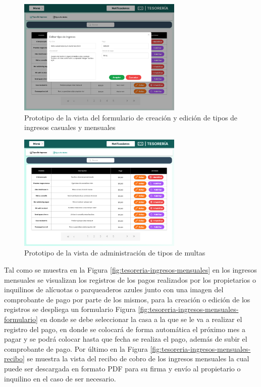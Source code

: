\begin{figure}[H]
    \centering
    \includegraphics[width=0.7\textwidth]{resources/images/tesoreia - tipos edit}
    \caption{Prototipo de la vista del formulario de creación y edición de tipos de ingresos casuales y mensuales}
    \label{fig:tesoreria-tipos-edit}
\end{figure}

\begin{figure}[H]
    \centering
    \includegraphics[width=0.7\textwidth]{resources/images/tesoreia - multas}
    \caption{Prototipo de la vista de administración de tipos de multas}
    \label{fig:tesoreria-tipos-multas}
\end{figure}

Tal como se muestra en la Figura \ref{fig:tesoreria-ingresos-mensuales} en los ingresos mensuales se visualizan los registros de los pagos realizados por los propietarios o inquilinos de alícuotas o parqueaderos azules junto con una imagen del comprobante de pago por parte de los mismos, para la creación o edición de los registros se despliega un formulario Figura \ref{fig:tesoreria-ingresos-mensuales-formulario} en donde se debe seleccionar la casa a la que se le va a realizar el registro del pago, en donde se colocará de forma automática el próximo mes a pagar y se podrá colocar hasta que fecha se realiza el pago, además de subir el comprobante de pago.
Por último en la Figura \ref{fig:tesoreria-ingresos-mensuales-recibo} se muestra la vista del recibo de cobro de los ingresos mensuales la cual puede ser descargada en formato PDF para su firma y envío al propietario o inquilino en el caso de ser necesario.

